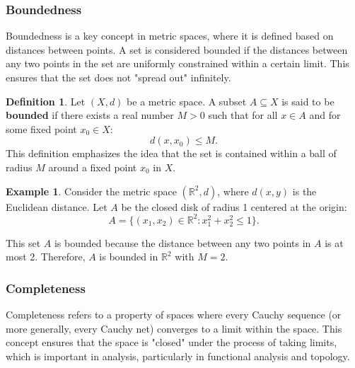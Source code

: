 \documentclass[12pt, reqno]{amsart}
\theoremstyle{definition}
\newtheorem{definition}[theorem]{Definition}
\newtheorem{example}[theorem]{Example}
\numberwithin{equation}{section}
\newcommand{\dR}{{\mathbb R}}
\begin{document}
\subsubsection{Boundedness}
Boundedness is a key concept in metric spaces, where it is defined based on distances between points. A set is considered bounded if the distances between any two points in the set are uniformly constrained within a certain limit. This ensures that the set does not "spread out" infinitely.
\begin{comment}
    \begin{definition}
Let $(X, d)$ be a metric space. A subset $A \subseteq X$ is said to be \textbf{bounded} if there exists a real number $M > 0$ such that for all $x, y \in A$:
\[
d(x, y) \leq M.
\]
\end{definition}

\begin{example}
Consider the real line $\dR$ with the standard Euclidean metric $d(x, y) = |x - y|$. Let $A = [0, 1]$ be a subset of $\dR$. 

The set $A$ is bounded because for any two points $x, y \in [0, 1]$, the distance between them is at most $1$, i.e., $d(x, y) \leq 1$. Therefore, $A$ is bounded in $\dR$ with $M = 1$.
\end{example}
\end{comment}
\begin{definition}
Let $(X, d)$ be a metric space. A subset $A \subseteq X$ is said to be \textbf{bounded} if there exists a real number $M > 0$ such that for all $x \in A$ and for some fixed point $x_0 \in X$:
\[
d(x, x_0) \leq M.
\]
This definition emphasizes the idea that the set is contained within a ball of radius $M$ around a fixed point $x_0$ in $X$.
\end{definition}

\begin{example}
Consider the metric space $(\mathbb{R}^2, d)$, where $d(x, y)$ is the Euclidean distance.
Let $A$ be the closed disk of radius 1 centered at the origin:
\[
A = \{ (x_1, x_2) \in \mathbb{R}^2 : x_1^2 + x_2^2 \leq 1 \}.
\]

This set $A$ is bounded because the distance between any two points in $A$ is at most 2. Therefore, $A$ is bounded in $\mathbb{R}^2$ with $M = 2$.
\end{example}
\subsubsection{Completeness}
Completeness refers to a property of spaces where every Cauchy sequence (or more generally, every Cauchy net) converges to a limit within the space. This concept ensures that the space is "closed" under the process of taking limits, which is important in analysis, particularly in functional analysis and topology.
\end{document}
